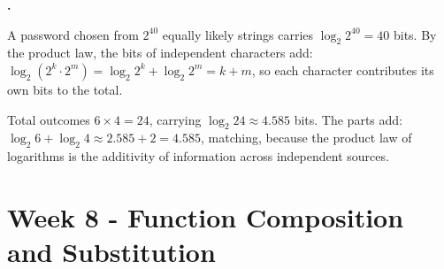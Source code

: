\documentclass[12pt]{book}
\newcounter{soln}[section]
\newenvironment{solutions}{%
  \setcounter{soln}{0}%
  \begin{list}{\textbf{\arabic{soln}.}}{%
    \usecounter{soln}\setlength{\leftmargin}{2.2em}\setlength{\itemsep}{10pt}}%
}{\end{list}}
\begin{document}
\begin{solutions}
\item A password chosen from $2^{40}$ equally likely strings carries
$\log_2 2^{40}=40$ bits. By the product law, the bits of independent characters add:
$\log_2(2^k\cdot2^m)=\log_2 2^k+\log_2 2^m=k+m$, so each character contributes its own
bits to the total.

\item Total outcomes $6\times4=24$, carrying $\log_2 24\approx4.585$ bits. The parts
add: $\log_2 6+\log_2 4\approx2.585+2=4.585$, matching, because the product law of
logarithms is the additivity of information across independent sources.
\end{solutions}

\section*{Week 8 - Function Composition and Substitution}
\setcounter{section}{8}
\end{document}
